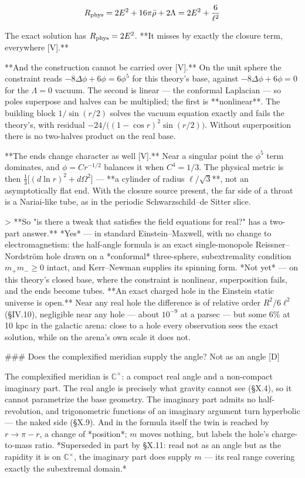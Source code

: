 $$R_{\rm phys} = 2E^2+16\pi\bar\rho+2\Lambda = 2E^2+\frac{6}{\ell^2}$$

The exact solution has $R_{\rm phys} = 2E^2$. **It misses by exactly the closure term, everywhere [V].**

**And the construction cannot be carried over [V].** On the unit sphere the constraint reads $-8\Delta\phi+6\phi = 6\phi^5$ for this theory's base, against $-8\Delta\phi+6\phi = 0$ for the $\Lambda = 0$ vacuum. The second is linear — the conformal Laplacian — so poles superpose and halves can be multiplied; the first is **nonlinear**. The building block $1/\sin(r/2)$ solves the vacuum equation exactly and fails the theory's, with residual $-24/\big((1-\cos r)^2\sin(r/2)\big)$. Without superposition there is no two-halves product on the real base.

**The ends change character as well [V].** Near a singular point the $\phi^5$ term dominates, and $\phi = Cr^{-1/2}$ balances it when $C^4 = 1/3$. The physical metric is then $\tfrac13\big[(d\ln r)^2+d\Omega^2\big]$ — **a cylinder of radius $\ell/\sqrt3$**, not an asymptotically flat end. With the closure source present, the far side of a throat is a Nariai-like tube, as in the periodic Schwarzschild–de Sitter slice.

> **So "is there a tweak that satisfies the field equations for real?" has a two-part answer.** *Yes* — in standard Einstein–Maxwell, with no change to electromagnetism: the half-angle formula is an exact single-monopole Reissner–Nordström hole drawn on a *conformal* three-sphere, subextremality condition $m_+m_-\geq0$ intact, and Kerr–Newman supplies its spinning form. *Not yet* — on this theory's closed base, where the constraint is nonlinear, superposition fails, and the ends become tubes. **An exact charged hole in the Einstein static universe is open.** Near any real hole the difference is of relative order $R^2/6\ell^2$ (§IV.10), negligible near any hole — about $10^{-9}$ at a parsec — but some $6\%$ at 10 kpc in the galactic arena: close to a hole every observation sees the exact solution, while on the arena's own scale it does not.

### Does the complexified meridian supply the angle? Not as an angle [D]

The complexified meridian is $\mathbb{C}^\times$: a compact real angle and a non-compact imaginary part. The real angle is precisely what gravity cannot see (§X.4), so it cannot parametrize the base geometry. The imaginary part admits no half-revolution, and trigonometric functions of an imaginary argument turn hyperbolic — the naked side (§X.9). And in the formula itself the twin is reached by $r\to\pi-r$, a change of *position*; $m$ moves nothing, but labels the hole's charge-to-mass ratio. *Superseded in part by §X.11: read not as an angle but as the rapidity it is on $\mathbb{C}^\times$, the imaginary part does supply $m$ — its real range covering exactly the subextremal domain.*

